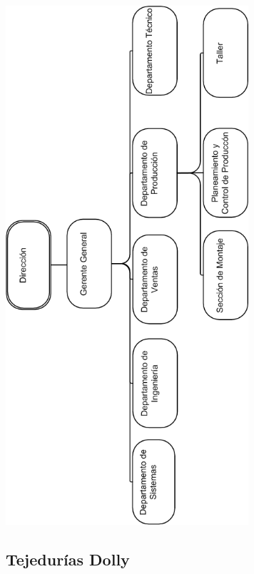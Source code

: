 \documentclass[a4paper,10pt,titlepage]{article}
\begin{document}
\begin{center}
\includegraphics[width=90mm]{./herculesBNSol.png}
 \end{center}



\newpage
\subsection{Tejedur\'ias Dolly}
\end{document}
